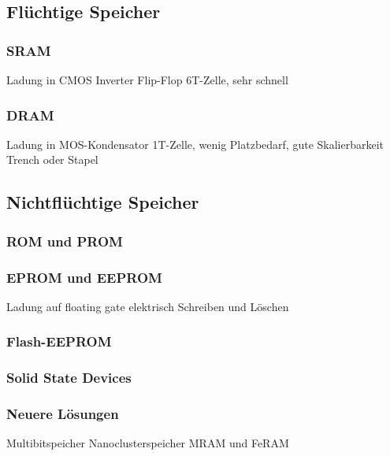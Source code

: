 \subsection{Flüchtige Speicher}
	\subsubsection{SRAM}
	Ladung in CMOS Inverter Flip-Flop
	6T-Zelle, sehr schnell
	
	\subsubsection{DRAM}
	Ladung in MOS-Kondensator
	1T-Zelle, wenig Platzbedarf, gute Skalierbarkeit
	Trench oder Stapel

\subsection{Nichtflüchtige Speicher}
	\subsubsection{ROM und PROM}
	\subsubsection{EPROM und EEPROM}
	Ladung auf floating gate
	elektrisch Schreiben und Löschen
	\subsubsection{Flash-EEPROM}
	\subsubsection{Solid State Devices}
	\subsubsection{Neuere Lösungen}
	Multibitspeicher
	Nanoclusterspeicher
	MRAM und FeRAM





